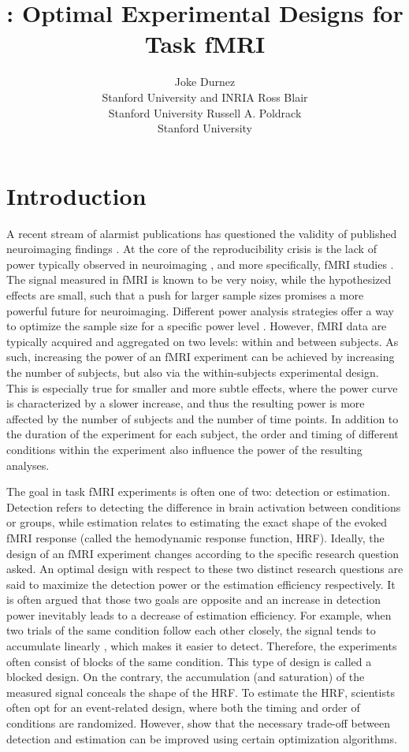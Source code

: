 \documentclass[article]{jss}
\author{Joke Durnez\\ Stanford University and INRIA \And
        Ross Blair\\ Stanford University \And
        Russell A. Poldrack \\ Stanford University}
\title{\pkg{neurodesign}: Optimal Experimental Designs for Task fMRI}
\begin{document}
\section{Introduction}\label{sec:introduction}
A recent stream of alarmist publications has questioned the validity
of published neuroimaging findings
\citep{Eklund2016-il,Ioannidis2005-ls,Open_Science_Collaboration2015-ev}.
At the core of the reproducibility crisis is the lack of power
typically observed in neuroimaging \citep{Button2013-zr}, and more
specifically, fMRI studies \citep{Durnez2014-ev}.  The signal measured
in fMRI is known to be very noisy, while the hypothesized effects are
small, such that a push for larger sample sizes promises a more
powerful future for neuroimaging.  Different power analysis strategies
offer a way to optimize the sample size for a specific power level
\citep{Durnez2014-ev,Mumford2008-qu,Hayasaka2007-fh,Durnez2016-bn}.
However, fMRI data are typically acquired and aggregated on two
levels: within and between subjects.  As such, increasing the power of
an fMRI experiment can be achieved by increasing the number of
subjects, but also via the within-subjects experimental design.  This
is especially true for smaller and more subtle effects, where the
power curve is characterized by a slower increase, and thus the
resulting power is more affected by the number of subjects and the
number of time points.  In addition to the duration of the experiment
for each subject, the order and timing of different conditions within
the experiment also influence the power of the resulting analyses.

The goal in task fMRI experiments is often one of two: detection or
estimation.  Detection refers to detecting the difference in brain
activation between conditions or groups, while estimation relates to
estimating the exact shape of the evoked fMRI response (called the
hemodynamic response function, HRF).  Ideally, the design of an fMRI
experiment changes according to the specific research question asked.
An optimal design with respect to these two distinct research
questions are said to maximize the detection power or the estimation
efficiency respectively.  It is often argued that those two goals are
opposite and an increase in detection power inevitably leads to a
decrease of estimation efficiency.  For example, when two trials of
the same condition follow each other closely, the signal tends to
accumulate linearly \citep{Dale1999-ik}, which makes it easier to
detect.  Therefore, the experiments often consist of blocks of the
same condition.  This type of design is called a blocked design.  On
the contrary, the accumulation (and saturation) of the measured signal
conceals the shape of the HRF.  To estimate the HRF, scientists often
opt for an event-related design, where both the timing and order of
conditions are randomized.  However, \citet{Kao2009-yo} show that the
necessary trade-off between detection and estimation can be improved
using certain optimization algorithms.
\end{document}
